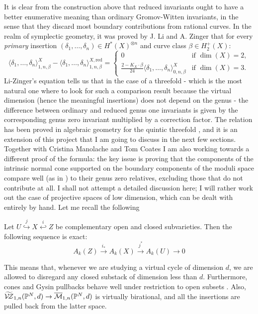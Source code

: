 It is clear from the construction above that reduced invariants ought to have a better enumerative meaning than ordinary Gromov-Witten invariants, in the sense that they discard most boundary contributions from rational curves. In the realm of symplectic geometry, it was proved by J. Li and A. Zinger \cite{LZ} that for every \emph{primary} insertion $(\delta_1,\ldots,\delta_n)\in H^*(X)^{\otimes n}$ and curve class $\beta\in H^+_2(X)$:
\[
 \langle \delta_1,\ldots,\delta_n \rangle^X_{1,n,\beta}-\langle \delta_1,\ldots,\delta_n \rangle^{X,\mathrm{red}}_{1,n,\beta}=\begin{cases}
 0 & \text{if } \dim(X)=2, \\
 \frac{2-K_X\cdot\beta}{24}\langle \delta_1,\ldots,\delta_n \rangle^X_{0,n,\beta} & \text{if } \dim(X)=3.\end{cases}
\]
Li-Zinger's equation tells us that in the case of a threefold - which is the most natural one where to look for such a comparison result because the virtual dimension (hence the meaningful insertions) does not depend on the genus - the difference between ordinary and reduced genus one invariants is given by the corresponding genus zero invariant multiplied by a correction factor. The relation has been proved in algebraic geometry for the quintic threefold \cite{CL}, and it is an extension of this project that I am going to discuss in the next few sections. Together with Cristina Manolache and Tom Coates I am also working towards a different proof of the formula: the key issue is proving that the components of the intrinsic normal cone supported on the boundary components of the moduli space compare well (as in \cite{Manolache-Push}) to their genus zero relatives, excluding those that do not contribute at all. I shall not attempt a detailed discussion here; I will rather work out the case of projective spaces of low dimension, which can be dealt with entirely by hand. Let me recall the following
\begin{lemma}\cite[Proposition 1.8]{Ful}
Let $U\overset{j}{\hookrightarrow} X \overset{i}{\hookleftarrow} Z$ be complementary open and closed subvarieties. Then the following sequence is exact:
\[A_k(Z)\overset{i_*}{\to} A_k(X)\overset{j^*}{\to} A_k(U)\to 0\]
\end{lemma}
This means that, whenever we are studying a virtual cycle of dimension $d$, we are allowed to disregard any closed substack of dimension less than $d$. Furthermore, cones and Gysin pullbacks behave well under restriction to open subsets \cite[Proposition 4.2(b) and Theorem 6.2(b)]{Ful}. Also, $\widetilde{\mathcal{V\!Z}}_{1,n}(\mathbb P^N,d)\rightarrow \overline{\mathcal{M}}_{1,n}(\mathbb P^N,d)$ is virtually birational, and all the insertions are pulled back from the latter space.  

